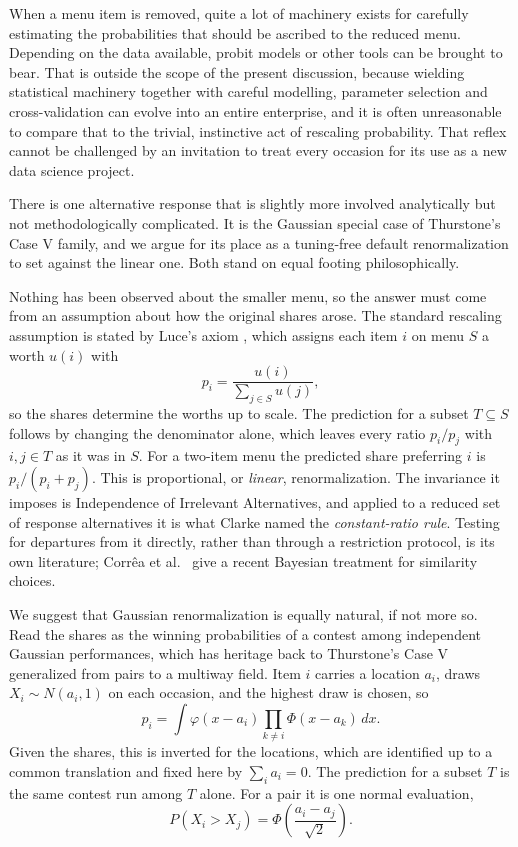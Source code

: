 \documentclass[11pt]{article}
\begin{document}
When a menu item is removed, quite a lot of machinery exists for carefully estimating the
probabilities that should be ascribed to the reduced menu. Depending on the data available,
probit models or other tools can be brought to bear. That is outside the scope of the present
discussion, because wielding statistical machinery together with careful modelling, parameter
selection and cross-validation can evolve into an entire enterprise, and it is often unreasonable
to compare that to the trivial, instinctive act of rescaling probability. That reflex cannot be
challenged by an invitation to treat every occasion for its use as a new data science project.

There is one alternative response that is slightly more involved analytically but not
methodologically complicated. It is the Gaussian special case of Thurstone's Case V family, and
we argue for its place as a tuning-free default renormalization to set against the linear one.
Both stand on equal footing philosophically.

Nothing has been observed about the smaller menu, so the answer must come from an assumption
about how the original shares arose. The standard rescaling assumption is stated by Luce's axiom
\cite{luce1959}, which assigns each item $i$ on menu $S$ a worth $u(i)$ with
\begin{equation}
p_i = \frac{u(i)}{\sum_{j \in S} u(j)},
\label{eq:luce}
\end{equation}
so the shares determine the worths up to scale. The prediction for a subset $T \subseteq S$
follows by changing the denominator alone, which leaves every ratio $p_i/p_j$ with $i,j \in T$
as it was in $S$. For a two-item menu the predicted share preferring $i$ is $p_i/(p_i+p_j)$.
This is proportional, or \emph{linear}, renormalization. The invariance it imposes is Independence of Irrelevant
Alternatives, and applied to a reduced set of response alternatives it is what Clarke
\cite{clarke1957} named the \emph{constant-ratio rule}. Testing for departures from it directly,
rather than through a restriction protocol, is its own literature; Corr\^{e}a et al.\
\cite{correa2025} give a recent Bayesian treatment for similarity choices.

We suggest that Gaussian renormalization is equally natural, if not more so. Read the shares as
the winning probabilities of a contest among independent Gaussian performances, which has
heritage back to Thurstone's Case V \cite{thurstone1927} generalized from pairs to a multiway
field. Item $i$
carries a location $a_i$, draws $X_i \sim N(a_i,1)$ on each occasion, and the highest draw is
chosen, so
\begin{equation}
p_i = \int \varphi(x - a_i) \prod_{k \neq i} \Phi(x - a_k)\, dx.
\label{eq:winprob}
\end{equation}
Given the shares, this is inverted for the locations, which are identified up to a common
translation and fixed here by $\sum_i a_i = 0$. The prediction for a subset $T$ is the same
contest run among $T$ alone. For a pair it is one normal evaluation,
\begin{equation}
P(X_i > X_j) = \Phi\!\left(\frac{a_i - a_j}{\sqrt{2}}\right).
\label{eq:pair}
\end{equation}
\end{document}
